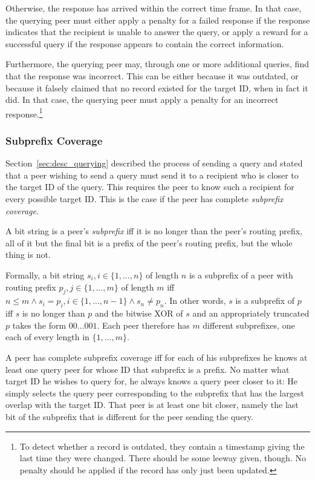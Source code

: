 Otherwise, the response has arrived within the correct time frame. In that case,
the querying peer must either apply a penalty for a failed response if the
response indicates that the recipient is unable to answer the query, or apply a
reward for a successful query if the response appears to contain the correct
information.

Furthermore, the querying peer may, through one or more additional queries, find
that the response was incorrect. This can be either because it was outdated, or
because it falsely claimed that no record existed for the target ID, when in
fact it did. In that case, the querying peer must apply a penalty for an
incorrect response.\footnote{To detect whether a record is outdated, they
contain a timestamp giving the last time they were changed. There should be some
leeway given, though. No penalty should be applied if the record has only just
been updated.}

\subsubsection{Subprefix Coverage}
Section~\ref{sec:desc_querying} described the process of sending a query and
stated that a peer wishing to send a query must send it to a recipient who is
closer to the target ID of the query. This requires the peer to know such a
recipient for every possible target ID. This is the case if the peer has
complete \emph{subprefix coverage}.

A bit string is a peer's \emph{subprefix} iff it is no longer than the peer's
routing prefix, all of it but the final bit is a prefix of the peer's routing
prefix, but the whole thing is not.

Formally, a bit string $s_i, i \in \{1, \ldots, n\}$ of length $n$ is a
subprefix of a peer with routing prefix $p_j, j \in \{1, \ldots, m\}$ of length
$m$ iff $n \leq m \land s_i = p_i, i \in \{1, \ldots, n - 1\} \land s_n \neq
p_n$. In other words, $s$ is a subprefix of $p$ iff $s$ is no longer than $p$
and the bitwise XOR of $s$ and an appropriately truncated $p$ takes the form
$00\ldots001$. Each peer therefore has $m$ different subprefixes, one each of
every length in $\{1, \ldots, m\}$.

A peer has complete subprefix coverage iff for each of his subprefixes he knows
at least one query peer for whose ID that subprefix is a prefix. No matter what
target ID he wishes to query for, he always knows a query peer closer to it: He
simply selects the query peer corresponding to the subprefix that has the
largest overlap with the target ID. That peer is at least one bit closer, namely
the last bit of the subprefix that is different for the peer sending the query.

